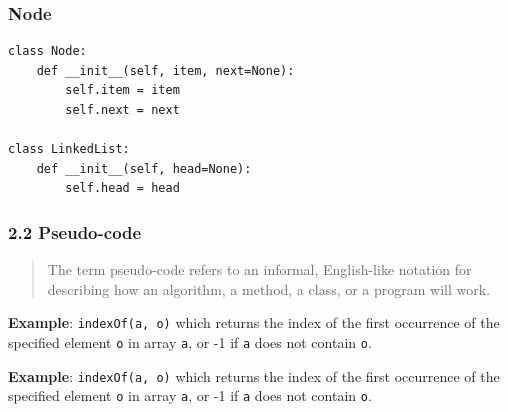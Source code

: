 \documentclass[aspectratio=169, 14pt]{beamer}
\begin{document}
\begin{frame}[fragile]
    \frametitle{Node}

    \begin{verbatim}
class Node:
    def __init__(self, item, next=None):
        self.item = item
        self.next = next

class LinkedList:
    def __init__(self, head=None):
        self.head = head
    \end{verbatim}
\end{frame}


\begin{frame}
    \frametitle{2.2 Pseudo-code}

    \begin{quote}
        The term \alert{pseudo-code} refers to an informal, English-like notation for describing how an algorithm, a method, a class, or a program will work.
    \end{quote}

    \textbf{Example}: \texttt{indexOf(a, o)} which returns the index of the first occurrence of the specified element \texttt{o} in array \texttt{a}, or -1 if \texttt{a} does not contain \texttt{o}.
\end{frame}

\begin{frame}[fragile]

    \textbf{Example}: \texttt{indexOf(a, o)} which returns the index of the first occurrence of the specified element \texttt{o} in array \texttt{a}, or -1 if \texttt{a} does not contain \texttt{o}.

\pause
\end{frame}
\end{document}
